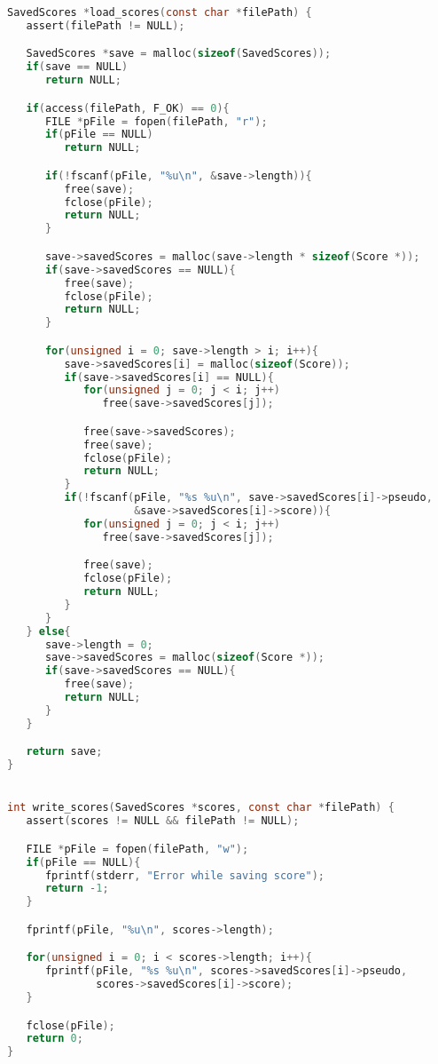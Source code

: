 \begin{lstlisting}[language=C]
SavedScores *load_scores(const char *filePath) {
   assert(filePath != NULL);

   SavedScores *save = malloc(sizeof(SavedScores));
   if(save == NULL)
      return NULL;

   if(access(filePath, F_OK) == 0){
      FILE *pFile = fopen(filePath, "r");
      if(pFile == NULL)
         return NULL;

      if(!fscanf(pFile, "%u\n", &save->length)){
         free(save);
         fclose(pFile);
         return NULL;
      }

      save->savedScores = malloc(save->length * sizeof(Score *));
      if(save->savedScores == NULL){
         free(save);
         fclose(pFile);
         return NULL;
      }

      for(unsigned i = 0; save->length > i; i++){
         save->savedScores[i] = malloc(sizeof(Score));
         if(save->savedScores[i] == NULL){
            for(unsigned j = 0; j < i; j++)
               free(save->savedScores[j]);

            free(save->savedScores);
            free(save);
            fclose(pFile);
            return NULL;
         }
         if(!fscanf(pFile, "%s %u\n", save->savedScores[i]->pseudo,
                    &save->savedScores[i]->score)){
            for(unsigned j = 0; j < i; j++)
               free(save->savedScores[j]);

            free(save);
            fclose(pFile);
            return NULL;
         }
      }
   } else{
      save->length = 0;
      save->savedScores = malloc(sizeof(Score *));
      if(save->savedScores == NULL){
         free(save);
         return NULL;
      }
   }

   return save;
}


int write_scores(SavedScores *scores, const char *filePath) {
   assert(scores != NULL && filePath != NULL);

   FILE *pFile = fopen(filePath, "w");
   if(pFile == NULL){
      fprintf(stderr, "Error while saving score");
      return -1;
   }

   fprintf(pFile, "%u\n", scores->length);

   for(unsigned i = 0; i < scores->length; i++){
      fprintf(pFile, "%s %u\n", scores->savedScores[i]->pseudo,
              scores->savedScores[i]->score);
   }

   fclose(pFile);
   return 0;
}
\end{lstlisting}